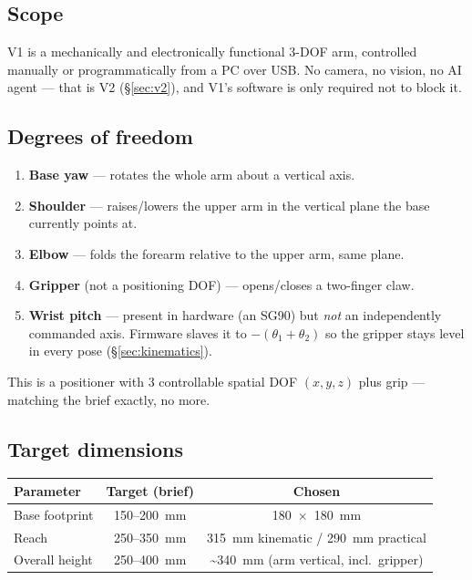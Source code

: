 \documentclass[11pt]{article}
\begin{document}
\subsection{Scope}
V1 is a mechanically and electronically functional 3-DOF arm, controlled manually or programmatically from a PC over USB. No camera, no vision, no AI agent --- that is V2 (\S\ref{sec:v2}), and V1's software is only required not to block it.

\subsection{Degrees of freedom}
\begin{enumerate}
\item \textbf{Base yaw} --- rotates the whole arm about a vertical axis.
\item \textbf{Shoulder} --- raises/lowers the upper arm in the vertical plane the base currently points at.
\item \textbf{Elbow} --- folds the forearm relative to the upper arm, same plane.
\item \textbf{Gripper} (not a positioning DOF) --- opens/closes a two-finger claw.
\item \textbf{Wrist pitch} --- present in hardware (an SG90) but \emph{not} an independently commanded axis. Firmware slaves it to $-(\theta_1+\theta_2)$ so the gripper stays level in every pose (\S\ref{sec:kinematics}).
\end{enumerate}

This is a positioner with 3 controllable spatial DOF $(x,y,z)$ plus grip --- matching the brief exactly, no more.

\subsection{Target dimensions}
\begin{center}
\begin{tabular}{lcc}
\toprule
\textbf{Parameter} & \textbf{Target (brief)} & \textbf{Chosen} \\
\midrule
Base footprint & 150--200~mm & 180~$\times$~180~mm \\
Reach & 250--350~mm & 315~mm kinematic / 290~mm practical \\
Overall height & 250--400~mm & \textasciitilde340~mm (arm vertical, incl.\ gripper) \\
\bottomrule
\end{tabular}
\end{center}
\end{document}
